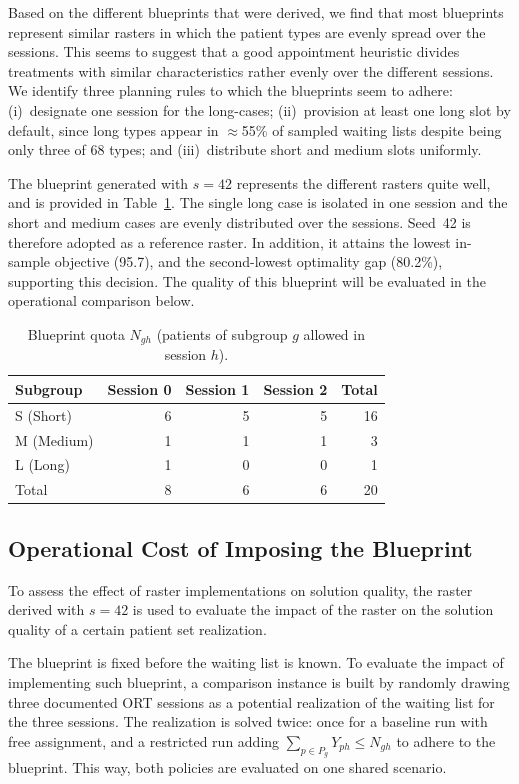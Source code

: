 Based on the different blueprints that were derived, we find that most blueprints represent similar rasters in which the patient types are evenly spread over the sessions.
This seems to suggest that a good appointment heuristic divides treatments with similar characteristics rather evenly over the different sessions.
We identify three planning rules to which the blueprints seem to adhere:
(i)~designate one session for the long-cases; (ii)~provision at least one
long slot by default, since long types appear in $\approx$55\% of sampled
waiting lists despite being only three of 68 types; and (iii)~distribute short and medium slots
uniformly.

The blueprint generated with $s=42$ represents the different rasters quite well, and is provided in Table~\ref{tab:bp_quota}. The single long
case is isolated in one session and the short and medium cases are evenly distributed over the sessions.
Seed~42 is therefore adopted as a reference raster. In addition, it attains the lowest in-sample
objective (95.7), and the second-lowest optimality gap (80.2\%), supporting this decision. 
The quality of this blueprint will be evaluated in the operational comparison below.

\begin{table}[h]
  \centering
  \caption{Blueprint quota $N_{gh}$ (patients of subgroup $g$ allowed in session $h$).}
  \label{tab:bp_quota}
  \begin{tabular}{lrrrr}
    \toprule
    Subgroup & Session 0 & Session 1 & Session 2 & Total \\
    \midrule
    S (Short)  & 6 & 5 & 5 & 16 \\
    M (Medium) & 1 & 1 & 1 & 3  \\
    L (Long)   & 1 & 0 & 0 & 1  \\
    \midrule
    Total      & 8 & 6 & 6 & 20 \\
    \bottomrule
  \end{tabular}
\end{table}

\subsection{Operational Cost of Imposing the Blueprint}
\label{sec:bp_apply}
To assess the effect of raster implementations on solution quality, the raster derived with $s=42$ is used to evaluate the impact of the raster on the solution quality of a certain patient set realization. 

The blueprint is fixed before the waiting list is known. To evaluate the impact of implementing such blueprint, a comparison instance is built by randomly drawing three documented
ORT sessions as a potential realization of the waiting list for the three sessions. The realization is solved twice: once for a baseline
run with free assignment, and a restricted run adding
$\sum_{p \in P_g} Y_{ph} \leq N_{gh}$ to adhere to the blueprint. This way, both policies are evaluated
on one shared scenario. 

